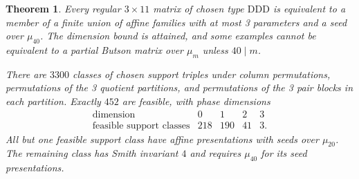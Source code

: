 \documentclass[11pt,a4paper]{article}
\newtheorem{theorem}{Theorem}[section]
\theoremstyle{plain}
\theoremstyle{definition}
\theoremstyle{plain}
\begin{document}
\par\addvspace{\medskipamount}\noindent
\begin{minipage}{\linewidth}
\begin{theorem}\label{n11_noA_DDD:main}
Every regular $3\times11$ matrix of chosen type $\mathrm{DDD}$ is equivalent to a member of a finite union of affine families with at most 3 parameters and a seed over $\mu_{40}$. The dimension bound is attained, and some examples cannot be equivalent to a partial Butson matrix over $\mu_m$ unless $40\mid m$.

There are $3300$ classes of chosen support triples under column permutations, permutations of the 3 quotient partitions, and permutations of the 3 pair blocks in each partition. Exactly $452$ are feasible, with phase dimensions
$$\begin{array}{c|rrrr}
\text{dimension}&0&1&2&3\\\hline
\text{feasible support classes}&218&190&41&3.
\end{array}$$
All but one feasible support class have affine presentations with seeds over $\mu_{20}$. The remaining class has Smith invariant $4$ and requires $\mu_{40}$ for its seed presentations.
\end{theorem}
\end{minipage}
\par\addvspace{\medskipamount}
\end{document}
